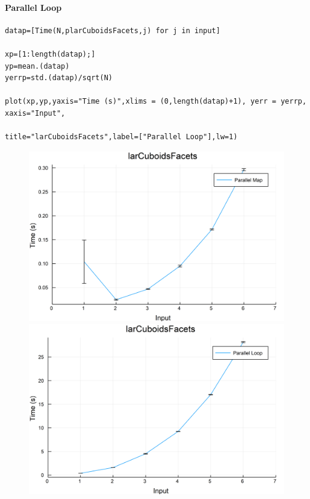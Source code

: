 \documentclass{article}
\begin{document}
\paragraph{Parallel Loop}
\begin{flushleft}\small
\begin{list}{}{} \item
    \begin{Verbatim}[tabsize=4]
datap=[Time(N,plarCuboidsFacets,j) for j in input]

xp=[1:length(datap);]
yp=mean.(datap)
yerrp=std.(datap)/sqrt(N)

plot(xp,yp,yaxis="Time (s)",xlims = (0,length(datap)+1), yerr = yerrp, xaxis="Input", 
                                        title="larCuboidsFacets",label=["Parallel Loop"],lw=1)
   \end{Verbatim}
\end{list}
\end{flushleft} 
\begin{figure}[h!]
\centering
\includegraphics[scale=0.06]{larCuboidsFacetsParMap.png}
\includegraphics[scale=0.06]{larCuboidsFacetsPar.png}
\end{figure}
\end{document}
